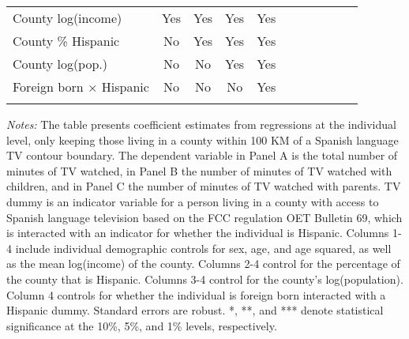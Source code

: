 \begin{table}[!htbp]
{\begin{threeparttable}
\begin{tabular}{lcccccccccc}
				County log(income) & Yes & Yes & Yes & Yes \\
				County \% Hispanic & No & Yes & Yes & Yes \\
				County log(pop.) & No & No & Yes & Yes \\
				Foreign born $\times$ Hispanic & No & No & No & Yes \\ 
				\addlinespace\hline\hline
			\end{tabular}
			\begin{tablenotes}[flushleft]
				\item \textit{Notes:} The table presents coefficient estimates from regressions at the individual level, only keeping those living in a county within 100 KM of a Spanish language TV contour boundary. The dependent variable in Panel A is the total number of minutes of TV watched, in Panel B the number of minutes of TV watched with children, and in Panel C the number of minutes of TV watched with parents. TV dummy is an indicator variable for a person living in a county with access to Spanish language television based on the FCC regulation OET Bulletin 69, which is interacted with an indicator for whether the individual is Hispanic. Columns 1-4 include individual demographic controls for sex, age, and age squared, as well as the mean log(income) of the county. Columns 2-4 control for the percentage of the county that is Hispanic. Columns 3-4 control for the county's log(population). Column 4 controls for whether the individual is foreign born interacted with a Hispanic dummy. Standard errors are robust. *, **, and *** denote statistical significance at the 10\%, 5\%, and 1\% levels, respectively.
			\end{tablenotes}
		\end{threeparttable}
	}
\end{table}
